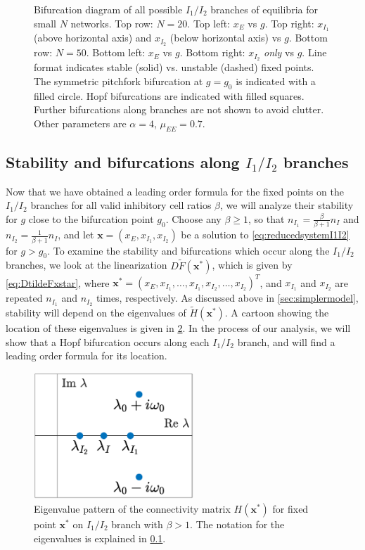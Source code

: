 \documentclass[reqno]{siamonline190516}
\newcommand{\xvec}{\mathbf{x}}
\begin{document}
\begin{figure}
\begin{tabular}{cc}
    \end{tabular}
    \caption{Bifurcation diagram of all possible $I_1/I_2$ branches of equilibria for small $N$ networks. Top row: $N=20$. Top left: $x_E$ vs $g$. Top right: $x_{I_1}$ (above horizontal axis) and $x_{I_2}$ (below horizontal axis) vs $g$. Bottom row: $N=50$. Bottom left: $x_E$ vs $g$. Bottom right: $x_{I_2}$ \emph{only} vs $g$. Line format indicates stable (solid) vs. unstable (dashed) fixed points. The symmetric pitchfork bifurcation at $g = g_0$ is indicated with a filled circle. Hopf bifurcations are indicated with filled squares. Further bifurcations along branches are not shown to avoid clutter. Other parameters are $\alpha = 4$, $\mu_{EE} = 0.7$.}
    \label{fig:noclusterBD1}
\end{figure}

\subsection{Stability and bifurcations along \texorpdfstring{$I_1/I_2$}{I1/I2} branches}\label{sec:I1I2stability}

Now that we have obtained a leading order formula for the fixed points on the $I_1/I_2$ branches for all valid inhibitory cell ratios $\beta$, we will analyze their stability for $g$ close to the bifurcation point $g_0$. Choose any $\beta \geq 1$, so that $n_{I_1} = \frac{\beta}{\beta+1}n_I$ and $n_{I_2} = \frac{1}{\beta+1}n_I$, and let $\xvec = (x_E, x_{I_1}, x_{I_2})$ be a solution to \cref{eq:reducedsystemI1I2} for $g > g_0$. To examine the stability and bifurcations which occur along the $I_1/I_2$ branches, we look at the linearization $D\tilde{F}(\xvec^*)$, which is given by \cref{eq:DtildeFxstar}, where $\xvec^* = (x_E, x_{I_1}, \dots, x_{I_1}, x_{I_2}, \dots, x_{I_2})^T$, and $x_{I_1}$ and $x_{I_2}$ are repeated $n_{I_1}$ and $n_{I_2}$ times, respectively. As discussed above in \cref{sec:simplermodel}, stability will depend on the eigenvalues of $\tilde{H}(\xvec^*)$. A cartoon showing the location of these eigenvalues is given in \cref{fig:Hstareignocluster}. In the process of our analysis, we will show that a Hopf bifurcation occurs along each $I_1/I_2$ branch, and will find a leading order formula for its location.

\begin{figure}
    \centering
    \includegraphics[width=6cm]{eigpatternxstarnocluster.eps}
    \caption{Eigenvalue pattern of the connectivity matrix $H(\xvec^*)$ for fixed point $\xvec^*$ on $I_1/I_2$ branch with $\beta > 1$. The notation for the eigenvalues is explained in \cref{sec:I1I2stability}.}
    \label{fig:Hstareignocluster}
\end{figure}
\end{document}
